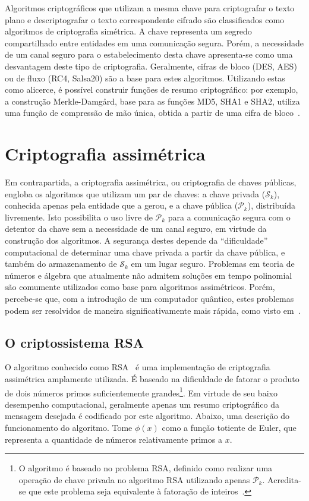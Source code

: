 \documentclass[12pt]{report}
\newcommand{\pk}{$\mathcal{P}_k$}
\newcommand{\sk}{$\mathcal{S}_k$}
\begin{document}
Algoritmos criptográficos que utilizam a mesma chave para criptografar o
texto plano e descriptografar o texto correspondente cifrado são classificados
como algoritmos de criptografia simétrica. A chave representa um segredo
compartilhado entre entidades em uma comunicação segura. Porém, a necessidade
de um canal seguro para o estabelecimento desta chave apresenta-se como uma
desvantagem deste tipo de criptografia. Geralmente, cifras de bloco (DES, AES)
ou de fluxo (RC4, Salsa20) são a base para estes algoritmos. Utilizando estas
como alicerce, é possível construir funções de resumo criptográfico: por
exemplo, a construção Merkle-Damgård, base para as funções MD5, SHA1 e SHA2,
utiliza uma função de compressão de mão única, obtida a partir de uma cifra de
bloco~\cite[9.41]{Menezes:1996:HAC:548089}.

\section{Criptografia assimétrica}

Em contrapartida, a criptografia assimétrica, ou criptografia de chaves
públicas, engloba os algoritmos que utilizam um par de chaves: a chave privada
(\sk{}), conhecida apenas pela entidade que a gerou, e a chave pública (\pk{}),
distribuída livremente. Isto possibilita o uso livre de \pk{} para a
comunicação segura com o detentor da chave sem a necessidade de um canal
seguro, em virtude da construção dos algoritmos. A segurança destes depende da
``dificuldade'' computacional de determinar uma chave privada a partir da chave
pública, e também do armazenamento de \sk{} em um lugar seguro. Problemas em
teoria de números e álgebra que atualmente não admitem soluções em tempo
polinomial são comumente utilizados como base para algoritmos assimétricos.
Porém, percebe-se que, com a introdução de um computador quântico, estes
problemas podem ser resolvidos de maneira significativamente mais rápida, como
visto em~\cite{Shor:1997:PAP:264393.264406}.

\subsection{O criptossistema RSA}

O algoritmo conhecido como RSA~\cite{Rivest:1978:MOD:359340.359342} é uma
implementação de criptografia assimétrica amplamente utilizada. É baseado na
dificuldade de fatorar o produto de dois números primos suficientemente
grandes\footnote{O algoritmo é baseado no problema RSA, definido como realizar
uma operação de chave privada no algoritmo RSA utilizando apenas \pk{}.
Acredita-se que este problema seja equivalente à fatoração de 
inteiros~\cite[3.30]{Menezes:1996:HAC:548089}.}. Em virtude de seu baixo desempenho
computacional, geralmente apenas um resumo criptográfico da mensagem desejada é
codificado por este algoritmo. Abaixo, uma descrição do funcionamento do
algoritmo. Tome $\phi(x)$ como a função totiente de Euler, que representa a
quantidade de números relativamente primos a $x$.
\end{document}
